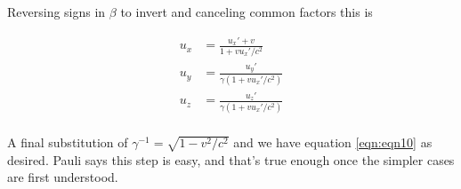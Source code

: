 Reversing signs in $\beta$ to invert and canceling common factors this is

\begin{align*}
u_x &=
\frac{u_x' + v }
{ 1 + v u_x'/c^2 } \\
u_y &=
\frac{u_y' }
{\gamma ( 1 + v u_x'/c^2 )} \\
u_z &=
\frac{u_z' }
{\gamma ( 1 + v u_x'/c^2 )} \\
\end{align*}

A final substitution of $\gamma^{-1} = \sqrt{1 - v^2/c^2}$ and we have
equation \ref{eqn:eqn10} as desired.  Pauli says this step is easy, and that's
true enough once the simpler cases are first understood.

%
%

%
